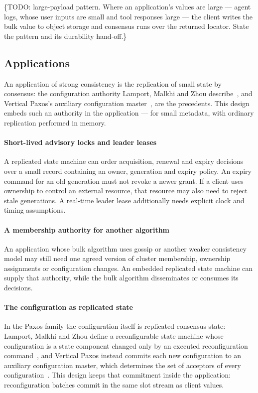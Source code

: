 \documentclass[10pt,journal,letterpaper]{IEEEtran}
\begin{document}
\{TODO: large-payload pattern. Where an application's values are large ---
agent logs, whose user inputs are small and tool responses large --- the
client writes the bulk value to object storage and consensus runs over the
returned locator. State the pattern and its durability hand-off.\}

\subsection{Applications}
An application of strong consistency is the replication of small state by
consensus: the configuration authority Lamport, Malkhi and Zhou
describe~\cite{reconfig-sm}, and Vertical Paxos's auxiliary configuration
master~\cite{vertical-paxos}, are the precedents. This design embeds such an
authority in the application --- for small metadata, with ordinary replication
performed in memory.

\paragraph{Short-lived advisory locks and leader leases}
A replicated state machine can order acquisition, renewal and expiry decisions over a small record containing an owner, generation and expiry policy. An expiry command for an old generation must not revoke a newer grant. If a client uses ownership to control an external resource, that resource may also need to reject stale generations. A real-time leader lease additionally needs explicit clock and timing assumptions.

\paragraph{A membership authority for another algorithm}
An application whose bulk algorithm uses gossip or another weaker consistency model may still need one agreed version of cluster membership, ownership assignments or configuration changes. An embedded replicated state machine can supply that authority, while the bulk algorithm disseminates or consumes its decisions.

\paragraph{The configuration as replicated state}
In the Paxos family the configuration itself is replicated consensus state: Lamport, Malkhi and Zhou define a reconfigurable state machine whose configuration is a state component changed only by an executed reconfiguration command~\cite{reconfig-sm}, and Vertical Paxos instead commits each new configuration to an auxiliary configuration master, which determines the set of acceptors of every configuration~\cite{vertical-paxos}. This design keeps that commitment inside the application: reconfiguration batches commit in the same slot stream as client values.
\end{document}
